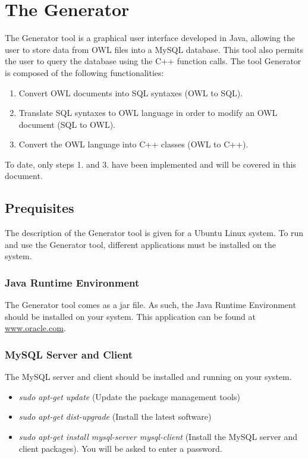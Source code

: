 \section{The Generator}\label{generator}

The Generator tool is a graphical user interface developed in Java, allowing the user to store data from OWL files into a MySQL database. This tool also permits the user to query the database using the C++ function calls. The tool Generator is composed of the following functionalities:
\begin{enumerate}
 \item Convert OWL documents into SQL syntaxes (OWL to SQL).
 \item Translate SQL syntaxes to OWL language in order to modify an OWL document (SQL to OWL).
 \item Convert the OWL language into C++ classes (OWL to C++).
\end{enumerate}

To date, only steps 1. and 3. have been implemented and will be covered in this document.

\subsection{Prequisites}\label{s:prequisites}
The description of the Generator tool is given for a Ubuntu Linux system. To run and use the Generator tool, different applications must be installed on the system.

\subsubsection{Java Runtime Environment}
The Generator tool comes as a jar file. As such, the Java Runtime Environment should be installed on your system. This application can be found at \url{www.oracle.com}.

\subsubsection{MySQL Server and Client}
The MySQL server and client should be installed and running on your system.
\begin{itemize}
 \item \textit{sudo apt-get update} (Update the package management tools)
 \item \textit{sudo apt-get dist-upgrade} (Install the latest software)
 \item \textit{sudo apt-get install mysql-server mysql-client} (Install the MySQL server and client packages). You will be asked to enter a password.
\end{itemize}

